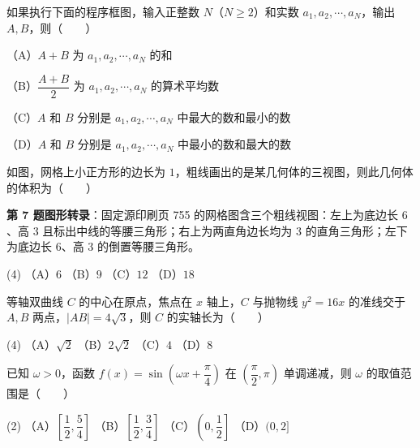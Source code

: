 \begin{question}
如果执行下面的程序框图，输入正整数 $N$（$N\geqslant2$）和实数 $a_1,a_2,\cdots,a_N$，输出 $A,B$，则\mbox{（　　）}
\nopagebreak[4]
\begin{center}\end{center}
\nopagebreak[4]
（A）$A+B$ 为 $a_1,a_2,\cdots,a_N$ 的和

（B）$\dfrac{A+B}{2}$ 为 $a_1,a_2,\cdots,a_N$ 的算术平均数

（C）$A$ 和 $B$ 分别是 $a_1,a_2,\cdots,a_N$ 中最大的数和最小的数

（D）$A$ 和 $B$ 分别是 $a_1,a_2,\cdots,a_N$ 中最小的数和最大的数

\Needspace{0.4\textheight}
\end{question}
\begin{question}
如图，网格上小正方形的边长为 $1$，粗线画出的是某几何体的三视图，则此几何体的体积为\mbox{（　　）}
\nopagebreak[4]
\begin{center}\end{center}
\nopagebreak[4]
\begin{gktip}
\textbf{第 7 题图形转录}：固定源印刷页 755 的网格图含三个粗线视图：左上为底边长 $6$、高 $3$ 且标出中线的等腰三角形；右上为两直角边长均为 $3$ 的直角三角形；左下为底边长 $6$、高 $3$ 的倒置等腰三角形。
\end{gktip}

\begin{gkopts}(4)
\task （A）$6$
\task （B）$9$
\task （C）$12$
\task （D）$18$
\end{gkopts}

\end{question}
\begin{question}
等轴双曲线 $C$ 的中心在原点，焦点在 $x$ 轴上，$C$ 与抛物线 $y^2=16x$ 的准线交于 $A,B$ 两点，$|AB|=4\sqrt3$，则 $C$ 的实轴长为\mbox{（　　）}

\begin{gkopts}(4)
\task （A）$\sqrt2$
\task （B）$2\sqrt2$
\task （C）$4$
\task （D）$8$
\end{gkopts}

\end{question}
\begin{question}
已知 $\omega>0$，函数 $f(x)=\sin\left(\omega x+\dfrac{\pi}{4}\right)$ 在 $\left(\dfrac{\pi}{2},\pi\right)$ 单调递减，则 $\omega$ 的取值范围是\mbox{（　　）}

\begin{gkopts}(2)
\task （A）$\left[\dfrac12,\dfrac54\right]$
\task （B）$\left[\dfrac12,\dfrac34\right]$
\task （C）$\left(0,\dfrac12\right]$
\task （D）$(0,2]$
\end{gkopts}

\Needspace{0.4\textheight}
\end{question}
